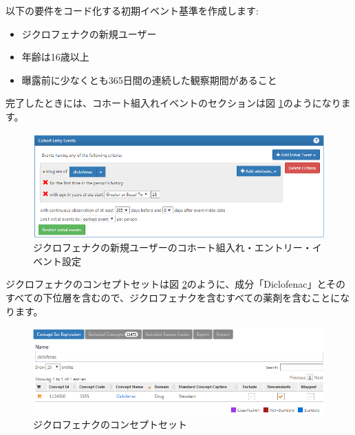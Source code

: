 \documentclass[
  11pt]{book}
\providecommand{\tightlist}{%
  \setlength{\itemsep}{0pt}\setlength{\parskip}{0pt}}
\theoremstyle{definition}
\theoremstyle{definition}
\theoremstyle{definition}
\theoremstyle{definition}
\theoremstyle{remark}
\begin{document}
以下の要件をコード化する初期イベント基準を作成します:

\begin{itemize}
\tightlist
\item
  ジクロフェナクの新規ユーザー
\item
  年齢は16歳以上
\item
  曝露前に少なくとも365日間の連続した観察期間があること
\end{itemize}

完了したときには、コホート組入れイベントのセクションは図 \ref{fig:cohortsAtlasInitialEvents}のようになります。

\begin{figure}

{\centering \includegraphics[width=1\linewidth]{images/SuggestedAnswers/cohortsAtlasInitialEvents} 

}

\caption{ジクロフェナクの新規ユーザーのコホート組入れ・エントリー・イベント設定}\label{fig:cohortsAtlasInitialEvents}
\end{figure}

ジクロフェナクのコンセプトセットは図 \ref{fig:cohortsAtlasConceptSet1}のように、成分「Diclofenac」とそのすべての下位層を含むので、ジクロフェナクを含むすべての薬剤を含むことになります。

\begin{figure}

{\centering \includegraphics[width=1\linewidth]{images/SuggestedAnswers/cohortsAtlasConceptSet1} 

}

\caption{ジクロフェナクのコンセプトセット}\label{fig:cohortsAtlasConceptSet1}
\end{figure}
\end{document}
